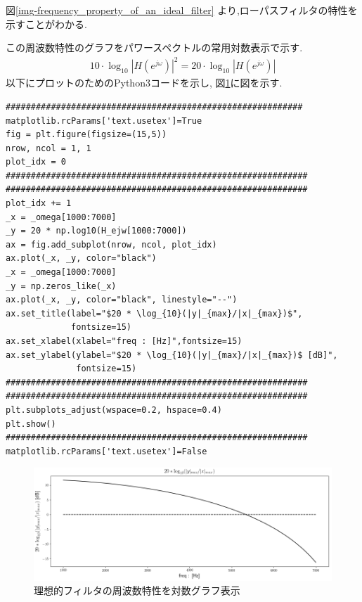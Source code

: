\documentclass[12pt]{jsarticle}
\begin{document}
    		図\ref{img-frequency_property_of_an_ideal_filter} より,ローパスフィルタの特性を示すことがわかる.

        この周波数特性のグラフをパワースペクトルの常用対数表示で示す.
        \begin{align*}
          10 \cdot \log_{10} | H(e^{j \omega}) |^2 = 20 \cdot \log_{10} | H(e^{j \omega}) |
        \end{align*}
        以下にプロットのためのPython3コードを示し, 図\ref{img-ideal_20log10(abs(fft(h,fs)))}に図を示す.
        \begin{lstlisting}[basicstyle=\ttfamily\footnotesize, frame=single]
###########################################################
matplotlib.rcParams['text.usetex']=True
fig = plt.figure(figsize=(15,5))
nrow, ncol = 1, 1
plot_idx = 0
############################################################
############################################################
plot_idx += 1
_x = _omega[1000:7000]
_y = 20 * np.log10(H_ejw[1000:7000])
ax = fig.add_subplot(nrow, ncol, plot_idx)
ax.plot(_x, _y, color="black")
_x = _omega[1000:7000]
_y = np.zeros_like(_x)
ax.plot(_x, _y, color="black", linestyle="--")
ax.set_title(label="$20 * \log_{10}(|y|_{max}/|x|_{max})$",
             fontsize=15)
ax.set_xlabel(xlabel="freq : [Hz]",fontsize=15)
ax.set_ylabel(ylabel="$20 * \log_{10}(|y|_{max}/|x|_{max})$ [dB]",
              fontsize=15)
############################################################
############################################################
plt.subplots_adjust(wspace=0.2, hspace=0.4)
plt.show()
############################################################
matplotlib.rcParams['text.usetex']=False
				\end{lstlisting}

    		\begin{figure}[H]
    			\begin{center}
    				\includegraphics[width=1.0\columnwidth]{img/ideal_20log10(abs(fft(h,fs))).png}
    				\caption{理想的フィルタの周波数特性を対数グラフ表示}
    				\label{img-ideal_20log10(abs(fft(h,fs)))}
    			\end{center}
    		\end{figure}
\end{document}
